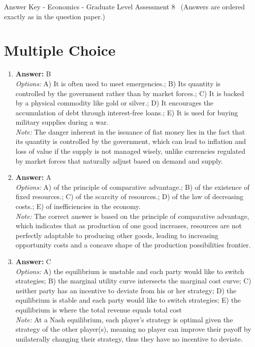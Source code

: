 \documentclass[12pt]{article}
\begin{document}
\begin{center}
Answer Key - Economics - Graduate Level Assessment 8 \
\small (Answers are ordered exactly as in the question paper.)
\end{center}

\section*{Multiple Choice}
\begin{enumerate}[label=\arabic*.]
\item \textbf{Answer:} B
\\ \textit{Options:} A) It is often used to meet emergencies.; B) Its quantity is controlled by the government rather than by market forces.; C) It is backed by a physical commodity like gold or silver.; D) It encourages the accumulation of debt through interest-free loans.; E) It is used for buying military supplies during a war.
\\ \textit{Note:} The danger inherent in the issuance of fiat money lies in the fact that its quantity is controlled by the government, which can lead to inflation and loss of value if the supply is not managed wisely, unlike currencies regulated by market forces that naturally adjust based on demand and supply.
\item \textbf{Answer:} A
\\ \textit{Options:} A) of the principle of comparative advantage.; B) of the existence of fixed resources.; C) of the scarcity of resources.; D) of the law of decreasing costs.; E) of inefficiencies in the economy.
\\ \textit{Note:} The correct answer is based on the principle of comparative advantage, which indicates that as production of one good increases, resources are not perfectly adaptable to producing other goods, leading to increasing opportunity costs and a concave shape of the production possibilities frontier.
\item \textbf{Answer:} C
\\ \textit{Options:} A) the equilibrium is unstable and each party would like to switch strategies; B) the marginal utility curve intersects the marginal cost curve; C) neither party has an incentive to deviate from his or her strategy; D) the equilibrium is stable and each party would like to switch strategies; E) the equilibrium is where the total revenue equals total cost
\\ \textit{Note:} At a Nash equilibrium, each player's strategy is optimal given the strategy of the other player(s), meaning no player can improve their payoff by unilaterally changing their strategy, thus they have no incentive to deviate.

\end{enumerate}
\end{document}
